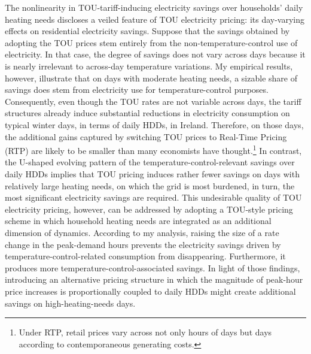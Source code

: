 The nonlinearity in TOU-tariff-inducing electricity savings over households' daily heating needs discloses a veiled feature of TOU electricity pricing: its day-varying effects on residential electricity savings. Suppose that the savings obtained by adopting the TOU prices stem entirely from the non-temperature-control use of electricity. In that case, the degree of savings does not vary across days because it is nearly irrelevant to across-day temperature variations. My empirical results, however, illustrate that on days with moderate heating needs, a sizable share of savings does stem from electricity use for temperature-control purposes. Consequently, even though the TOU rates are not variable across days, the tariff structures already induce substantial reductions in electricity consumption on typical winter days, in terms of daily HDDs, in Ireland. Therefore, on those days, the additional gains captured by switching TOU prices to Real-Time Pricing (RTP) are likely to be smaller than many economists have thought.\footnote{Under RTP, retail prices vary across not only hours of days but days according to contemporaneous generating costs.} In contrast, the U-shaped evolving pattern of the temperature-control-relevant savings over daily HDDs implies that TOU pricing induces rather fewer savings on days with relatively large heating needs, on which the grid is most burdened, in turn, the most significant electricity savings are required. This undesirable quality of TOU electricity pricing, however, can be addressed by adopting a TOU-style pricing scheme in which household heating needs are integrated as an additional dimension of dynamics. According to my analysis, raising the size of a rate change in the peak-demand hours prevents the electricity savings driven by temperature-control-related consumption from disappearing. Furthermore, it produces more temperature-control-associated savings. In light of those findings, introducing an alternative pricing structure in which the magnitude of peak-hour price increases is proportionally coupled to daily HDDs might create additional savings on high-heating-needs days.  


